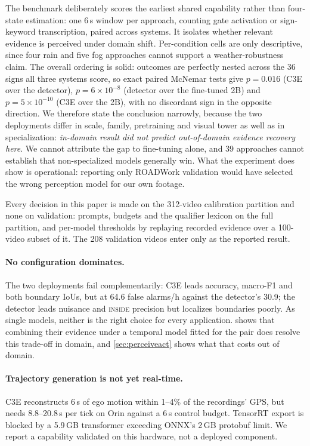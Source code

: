 \documentclass[journal]{IEEEtran}
\begin{document}
The benchmark deliberately scores the earliest shared capability rather than four-state estimation: one 6\,s window per approach, counting gate activation or sign-keyword transcription, paired across systems.  It isolates whether relevant evidence is perceived under domain shift.  Per-condition cells are only descriptive, since four rain and five fog approaches cannot support a weather-robustness claim.  The overall ordering is solid: outcomes are perfectly nested across the 36 signs all three systems score, so exact paired McNemar tests give $p=0.016$ (C3E over the detector), $p=6\times10^{-8}$ (detector over the fine-tuned 2B) and $p=5\times10^{-10}$ (C3E over the 2B), with no discordant sign in the opposite direction.  We therefore state the conclusion narrowly, because the two deployments differ in scale, family, pretraining and visual tower as well as in specialization: \emph{in-domain result did not predict out-of-domain evidence recovery here}.  We cannot attribute the gap to fine-tuning alone, and 39 approaches cannot establish that non-specialized models generally win.  What the experiment does show is operational: reporting only ROADWork validation would have selected the wrong perception model for our own footage.

Every decision in this paper is made on the 312-video calibration partition and none on validation: prompts, budgets and the qualifier lexicon on the full partition, and per-model thresholds by replaying recorded evidence over a 100-video subset of it.  The 208 validation videos enter only as the reported result.

\paragraph{No configuration dominates.}  The two deployments fail complementarily: C3E leads accuracy, macro-F1 and both boundary IoUs, but at 64.6 false alarms/h against the detector's 30.9; the detector leads nuisance and \textsc{inside} precision but localizes boundaries poorly.  As single models, neither is the right choice for every application.   shows that combining their evidence under a temporal model fitted for the pair does resolve this trade-off in domain, and \cref{sec:perceiveact} shows what that costs out of domain.

\paragraph{Trajectory generation is not yet real-time.}  C3E reconstructs 6\,s of ego motion within 1--4\% of the recordings' GPS, but needs 8.8--20.8\,s per tick on Orin against a 6\,s control budget.  TensorRT export is blocked by a 5.9\,GB transformer exceeding ONNX's 2\,GB protobuf limit.  We report a capability validated on this hardware, not a deployed component.
\end{document}
